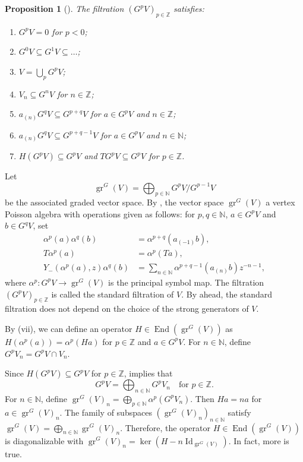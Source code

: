 \documentclass[a4paper, 12pt, reqno]{amsart}
\newtheorem{proposition}[theorem]{Proposition}
\theoremstyle{remark}
\numberwithin{equation}{subsection}
\DeclareMathOperator{\Id}{Id}
\DeclareMathOperator{\gr}{gr}
\DeclareMathOperator{\End}{End}
\begin{document}
\begin{proposition}[{\cite{li_vertex_2004}}]
  \label{prp:8}
  The filtration $(G^pV)_{p \in \mathbb{Z}}$ satisfies:
  \begin{enumerate}
  \item $G^pV = 0$ for $p < 0$;
  \item $G^0V \subseteq G^1V \subseteq \dots$;
  \item $V = \bigcup_pG^pV$;
  \item $V_n \subseteq G^nV$ for $n \in \mathbb{Z}$;
  \item $a_{(n)}G^qV \subseteq G^{p + q}V$ for $a \in G^pV$ and $n \in \mathbb{Z}$;
  \item $a_{(n)}G^qV \subseteq G^{p + q - 1}V$ for $a \in G^pV$ and $n \in \mathbb{N}$;
  \item $H(G^pV) \subseteq G^pV$ and $TG^pV \subseteq G^pV$ for $p \in \mathbb{Z}$.
  \end{enumerate}
\end{proposition}

Let
\begin{equation*}
  \gr^G(V) = \bigoplus_{p \in \mathbb{N}}G^pV/G^{p - 1}V
\end{equation*}
be the associated graded vector space.
By \cite{li_vertex_2004}, the vector space $\gr^G(V)$ a vertex Poisson algebra with operations given as follows: for $p, q \in \mathbb{N}$, $a \in G^pV$ and $b \in G^qV$, set
\begin{align*}
  \alpha^p(a)\alpha^q(b) &= \alpha^{p + q}(a_{(-1)}b), \\
  T\alpha^p(a) &= \alpha^p(Ta), \\
  Y_-(\alpha^p(a), z)\alpha^q(b) &= \sum_{n \in \mathbb{N}}\alpha^{p + q - 1}(a_{(n)}b)z^{-n - 1},
\end{align*}
where $\alpha^p: G^pV \to \gr^G(V)$ is the principal symbol map.
The filtration $(G^pV)_{p \in \mathbb{Z}}$ is called the standard filtration of $V$.
By  ahead, the standard filtration does not depend on the choice of the strong generators of $V$.

By (vii), we can define an operator $H \in \End(\gr^G(V))$ as $H(\alpha^p(a)) = \alpha^p(Ha)$ for $p \in \mathbb{Z}$ and $a \in G^pV$.
For $n \in \mathbb{N}$, define $G^pV_n = G^pV \cap V_n$.

Since $H(G^pV) \subseteq G^pV$ for $p \in \mathbb{Z}$,  implies that
\begin{equation}
  \label{eq:41}
  G^pV = \bigoplus_{n \in \mathbb{N}}G^pV_n \quad \text{for }p \in \mathbb{Z}.
\end{equation}
For $n \in \mathbb{N}$, define $\gr^G(V)_n = \bigoplus_{p \in \mathbb{N}}\alpha^p(G^pV_n)$.
Then $Ha = na$ for $a \in \gr^G(V)_n$.
The family of subspaces $(\gr^G(V)_n)_{n \in \mathbb{N}}$ satisfy $\gr^G(V) = \bigoplus_{n \in \mathbb{N}} \gr^G(V)_n$.
Therefore, the operator $H \in \End(\gr^G(V))$ is diagonalizable with $\gr^G(V)_n = \ker(H - n\Id_{\gr^G(V)})$.
In fact, more is true.
\end{document}
